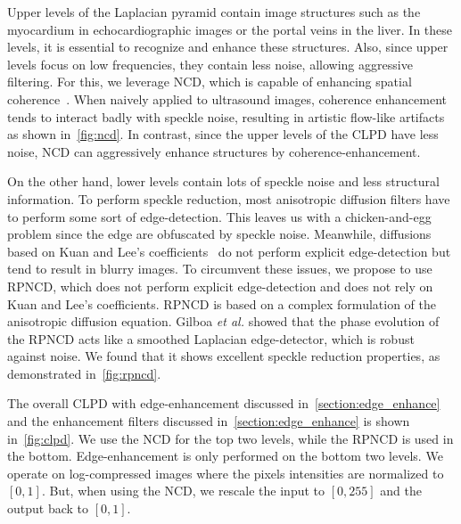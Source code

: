 %

Upper levels of the Laplacian pyramid contain image structures such as the myocardium in echocardiographic images or the portal veins in the liver.
In these levels, it is essential to recognize and enhance these structures.
Also, since upper levels focus on low frequencies, they contain less noise, allowing aggressive filtering.
For this, we leverage NCD, which is capable of enhancing spatial coherence~\cite{weickert_coherenceenhancing_1999}.
When naively applied to ultrasound images, coherence enhancement tends to interact badly with speckle noise, resulting in artistic flow-like artifacts as shown in~\cref{fig:ncd}.
In contrast, since the upper levels of the CLPD have less noise, NCD can aggressively enhance structures by coherence-enhancement.

On the other hand, lower levels contain lots of speckle noise and less structural information.
To perform speckle reduction, most anisotropic diffusion filters have to perform some sort of edge-detection.
This leaves us with a chicken-and-egg problem since the edge are obfuscated by speckle noise.
Meanwhile, diffusions based on Kuan and Lee's coefficients~\cite{yongjianyu_speckle_2002, aja-fernandez_estimation_2006, krissian_oriented_2007} do not perform explicit edge-detection but tend to result in blurry images.
To circumvent these issues, we propose to use RPNCD, which does not perform explicit edge-detection and does not rely on Kuan and Lee's coefficients.
RPNCD is based on a complex formulation of the anisotropic diffusion equation.
Gilboa \textit{et al.} showed that the phase evolution of the RPNCD acts like a smoothed Laplacian edge-detector, which is robust against noise.
We found that it shows excellent speckle reduction properties, as demonstrated in~\cref{fig:rpncd}.

The overall CLPD with edge-enhancement discussed in~\cref{section:edge_enhance} and the enhancement filters discussed in~\cref{section:edge_enhance} is shown in~\cref{fig:clpd}.
We use the NCD for the top two levels, while the RPNCD is used in the bottom.
Edge-enhancement is only performed on the bottom two levels.
We operate on log-compressed images where the pixels intensities are normalized to \([0, 1]\).
But, when using the NCD, we rescale the input to \([0, 255]\) and the output back to \([0, 1]\).

